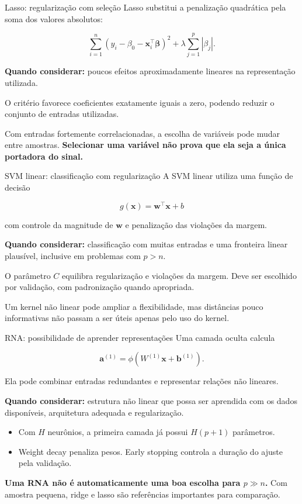 \documentclass[
  10pt,
  ignorenonframetext,
  aspectratio=169,
  brazilian,
]{beamer}
\providecommand{\tightlist}{%
  \setlength{\itemsep}{0pt}\setlength{\parskip}{0pt}}
\begin{document}
\begin{frame}{Lasso: regularização com seleção}
\protect{}\label{lasso-regularizauxe7uxe3o-com-seleuxe7uxe3o}
Lasso substitui a penalização quadrática pela soma dos valores
absolutos:

\[
\sum_{i=1}^{n}(y_i-\beta_0-\mathbf x_i^\top\boldsymbol\beta)^2
+\lambda\sum_{j=1}^{p}|\beta_j|.
\]

\textbf{Quando considerar:} poucos efeitos aproximadamente lineares na
representação utilizada.

O critério favorece coeficientes exatamente iguais a zero, podendo
reduzir o conjunto de entradas utilizadas.

Com entradas fortemente correlacionadas, a escolha de variáveis pode
mudar entre amostras. \textbf{Selecionar uma variável não prova que ela
seja a única portadora do sinal.}
\end{frame}

\begin{frame}{SVM linear: classificação com regularização}
\protect{}\label{svm-linear-classificauxe7uxe3o-com-regularizauxe7uxe3o}
A SVM linear utiliza uma função de decisão

\[
g(\mathbf x)=\mathbf w^\top\mathbf x+b
\]

com controle da magnitude de \(\mathbf w\) e penalização das violações
da margem.

\textbf{Quando considerar:} classificação com muitas entradas e uma
fronteira linear plausível, inclusive em problemas com \(p>n\).

O parâmetro \(C\) equilibra regularização e violações da margem. Deve
ser escolhido por validação, com padronização quando apropriada.

Um kernel não linear pode ampliar a flexibilidade, mas distâncias pouco
informativas não passam a ser úteis apenas pelo uso do kernel.
\end{frame}

\begin{frame}{RNA: possibilidade de aprender representações}
\protect{}\label{rna-possibilidade-de-aprender-representauxe7uxf5es}
Uma camada oculta calcula

\[
\mathbf a^{(1)}=\phi(W^{(1)}\mathbf x+\mathbf b^{(1)}).
\]

Ela pode combinar entradas redundantes e representar relações não
lineares.

\textbf{Quando considerar:} estrutura não linear que possa ser aprendida
com os dados disponíveis, arquitetura adequada e regularização.

\begin{itemize}
\tightlist
\item
  Com \(H\) neurônios, a primeira camada já possui \(H(p+1)\)
  parâmetros.
\item
  Weight decay penaliza pesos. Early stopping controla a duração do
  ajuste pela validação.
\end{itemize}

\textbf{Uma RNA não é automaticamente uma boa escolha para \(p\gg n\).}
Com amostra pequena, ridge e lasso são referências importantes para
comparação.
\end{frame}
\end{document}
